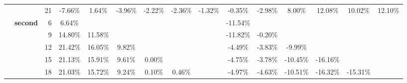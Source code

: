 \begin{table}[t]
{\begin{tabular}{ccrcccccccccccc}
          & \textcolor[rgb]{ .502,  .502,  .502}{} & 21    & \cellcolor[rgb]{ .98,  .824,  .835}-7.66\% & \cellcolor[rgb]{ .973,  .976,  .996}1.64\% & \cellcolor[rgb]{ .984,  .902,  .914}-3.96\% & \cellcolor[rgb]{ .984,  .941,  .953}-2.22\% & \cellcolor[rgb]{ .984,  .937,  .949}-2.36\% & \cellcolor[rgb]{ .984,  .957,  .969}-1.32\% & \cellcolor[rgb]{ .984,  .98,  .992}-0.35\% & \cellcolor[rgb]{ .984,  .925,  .933}-2.98\% & \cellcolor[rgb]{ .902,  .929,  .973}8.00\% & \cellcolor[rgb]{ .855,  .894,  .953}12.08\% & \cellcolor[rgb]{ .878,  .914,  .965}10.02\% & \cellcolor[rgb]{ .855,  .894,  .953}12.10\% \\
    \cmidrule(r){2-3}
          & \multicolumn{1}{l}{\textcolor[rgb]{ .502,  .502,  .502}{\textbf{second}}} & 6     & \cellcolor[rgb]{ .918,  .937,  .976}6.64\% &       &       &       &       &       & \cellcolor[rgb]{ .98,  .745,  .753}-11.54\% &       &       &       &       &  \\
          & \textcolor[rgb]{ .502,  .502,  .502}{} & 9     & \cellcolor[rgb]{ .827,  .875,  .945}14.80\% & \cellcolor[rgb]{ .863,  .898,  .957}11.58\% &       &       &       &       & \cellcolor[rgb]{ .98,  .737,  .749}-11.82\% & \cellcolor[rgb]{ .984,  .98,  .992}-0.20\% &       &       &       &  \\
          & \textcolor[rgb]{ .502,  .502,  .502}{} & 12    & \cellcolor[rgb]{ .753,  .824,  .918}21.42\% & \cellcolor[rgb]{ .812,  .863,  .937}16.05\% & \cellcolor[rgb]{ .882,  .914,  .965}9.82\% &       &       &       & \cellcolor[rgb]{ .984,  .89,  .902}-4.49\% & \cellcolor[rgb]{ .984,  .906,  .918}-3.83\% & \cellcolor[rgb]{ .98,  .776,  .788}-9.99\% &       &       &  \\
          & \textcolor[rgb]{ .502,  .502,  .502}{} & 15    & \cellcolor[rgb]{ .757,  .824,  .918}21.13\% & \cellcolor[rgb]{ .812,  .867,  .941}15.91\% & \cellcolor[rgb]{ .882,  .914,  .965}9.61\% & \cellcolor[rgb]{ .988,  .988,  1}0.00\% &       &       & \cellcolor[rgb]{ .984,  .886,  .898}-4.75\% & \cellcolor[rgb]{ .984,  .906,  .918}-3.78\% & \cellcolor[rgb]{ .98,  .769,  .776}-10.45\% & \cellcolor[rgb]{ .976,  .647,  .655}-16.16\% &       &  \\
          & \textcolor[rgb]{ .502,  .502,  .502}{} & 18    & \cellcolor[rgb]{ .757,  .827,  .922}21.03\% & \cellcolor[rgb]{ .816,  .867,  .941}15.72\% & \cellcolor[rgb]{ .886,  .918,  .965}9.24\% & \cellcolor[rgb]{ .988,  .988,  1}0.10\% & \cellcolor[rgb]{ .984,  .988,  1}0.46\% &       & \cellcolor[rgb]{ .984,  .882,  .894}-4.97\% & \cellcolor[rgb]{ .984,  .89,  .902}-4.63\% & \cellcolor[rgb]{ .98,  .765,  .776}-10.51\% & \cellcolor[rgb]{ .976,  .643,  .651}-16.32\% & \cellcolor[rgb]{ .976,  .663,  .675}-15.31\% &  \\

\end{tabular}}
\end{table}
